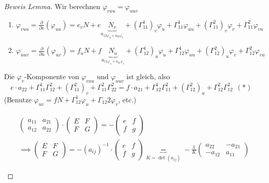 \documentclass[../main.tex]{subfiles}
\begin{document}
\begin{proof}[Beweis Lemma]
    Wir berechnen $\varphi_{vuu}=\varphi_{uuv}$ \begin{enumerate}
        \item $\varphi_{vuu} = \frac{\partial}{\partial v}(\varphi_{uu}) = e_{v}N+e\underbrace{N_{v}}_{a_{12\varphi_{u}+a_{22}\varphi_{v}}}+(\Gamma_{11}^{1})_{v}\varphi_{u}+\Gamma_{11}^{1}\varphi_{uu}+(\Gamma_{11}^{2})_{v}\varphi_{v}+\Gamma_{11}^{2}\varphi_{vu}$
        \item $\varphi_{uuv} = \frac{\partial}{\partial u}(\varphi_{uv}) = f_{u}N+f\underbrace{N_{u}}_{a_{11\varphi_{u}+a_{21}\varphi_{v}}}+(\Gamma_{12}^{1})_{u}\varphi_{u}+\Gamma_{12}^{1}\varphi_{uu}+(\Gamma_{12}^{2})_{u}\varphi_{v}+\Gamma_{12}^{2}\varphi_{vu}$
    \end{enumerate}
    Die $\varphi_{v}$-Komponente von $\varphi_{vuu}$ und $\varphi_{uuv}$ ist gleich, also 
    $$e\cdot a_{22}+\Gamma_{11}^{1}\Gamma_{12}^{2}+(\Gamma_{11}^{2})_{v}+\Gamma_{11}^{2}\Gamma_{22}^{2} = f\cdot a_{21}+\Gamma_{12}^{1}\Gamma_{11}^{2}+(\Gamma_{12}^{2})_{u}+\Gamma_{12}^{2}\Gamma_{12}^{2} \ \ (*)$$
    (Benutze $\varphi_{uv} = fN+\Gamma_{12}^{1}\varphi_{u}+\Gamma_{12}{2}\varphi_{v}$, etc.)
    \begin{recall}
        \begin{align*}
            &\begin{pmatrix}
                a_{11}&a_{21}\\a_{12}&a_{22}
            \end{pmatrix}\cdot \begin{pmatrix}
                E&F\\F&G
            \end{pmatrix} = -\begin{pmatrix}
                e&f\\f&g
            \end{pmatrix}\\
            &\implies \begin{pmatrix}
                E&F\\F&G
            \end{pmatrix} = -(a_{ij})^{-1}\cdot\begin{pmatrix}
                e&f\\f&g
            \end{pmatrix} \underbrace{=}_{K = \det(a_{ij})} -\frac{1}{K}\begin{pmatrix}
                a_{22}&-a_{21}\\-a_{12}&a_{11}

\end{pmatrix}
\end{align*}
\end{recall}
\end{proof}
\end{document}
